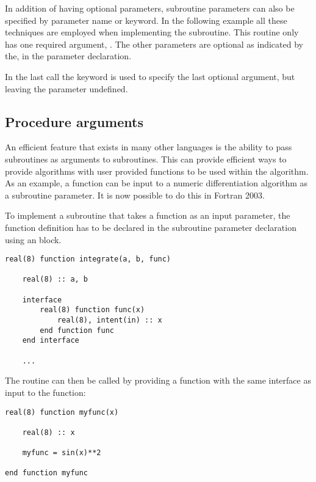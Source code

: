 In addition of having optional parameters, subroutine parameters can also be specified by parameter name or keyword. In the following example all these techniques are employed when implementing the  subroutine. This routine only has one required argument, . The other parameters are optional as indicated by the,  in the parameter declaration.



In the last call the  keyword is used to specify the last optional argument, but leaving the  parameter undefined.

\subsection{Procedure arguments}

An efficient feature that exists in many other languages is the ability to pass subroutines as arguments to subroutines. This can provide efficient ways to provide algorithms with user provided functions to be used within the algorithm. As an example, a function can be input to a numeric differentiation algorithm as a subroutine parameter. It is now possible to do this in Fortran 2003. 

To implement a subroutine that takes a function as an input parameter, the function definition has to be declared in the subroutine parameter declaration using an  block.

\begin{lstlisting}
real(8) function integrate(a, b, func)

	real(8) :: a, b
	
	interface 
		real(8) function func(x)
			real(8), intent(in) :: x
		end function func
	end interface
	
	...
\end{lstlisting}

The routine can then be called by providing a function with the same interface as input to the function:

\begin{lstlisting}
real(8) function myfunc(x)
	
	real(8) :: x
	
	myfunc = sin(x)**2
	
end function myfunc
\end{lstlisting}

